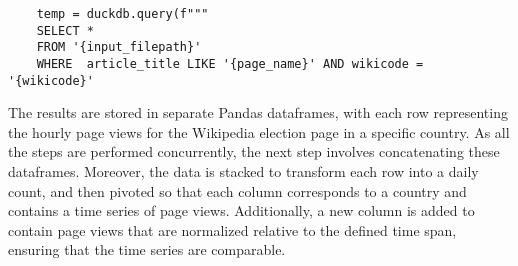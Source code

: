 \begin{verbatim}
    temp = duckdb.query(f"""
    SELECT *
    FROM '{input_filepath}'
    WHERE  article_title LIKE '{page_name}' AND wikicode = '{wikicode}'
\end{verbatim}

The results are stored in separate Pandas dataframes, with each row representing the hourly page views for the Wikipedia election page in a specific country. As all the steps are performed concurrently, the next step involves concatenating these dataframes. Moreover, the data is stacked to transform each row into a daily count, and then pivoted so that each column corresponds to a country and contains a time series of page views. Additionally, a new column is added to contain page views that are normalized relative to the defined time span, ensuring that the time series are comparable.








